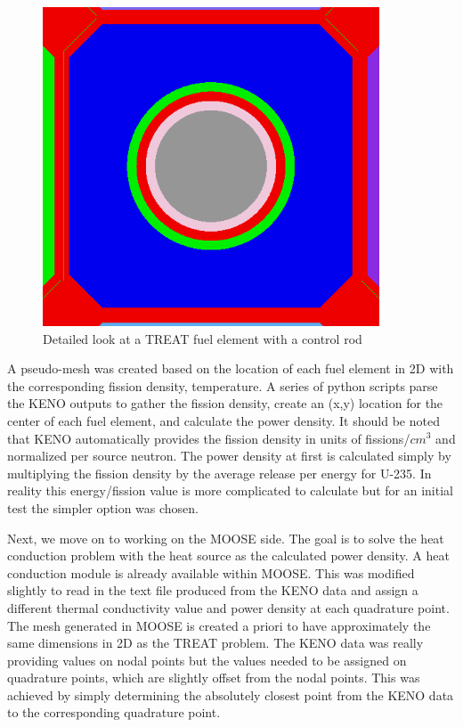 \documentclass[11pt]{article}
\begin{document}
\begin{figure}
    \centering
    \includegraphics[width=10cm]{figures/treat-fuel-elem.png}
    \caption{Detailed look at a TREAT fuel element with a control rod}
    \label{fig:treat2d}
\end{figure}

A pseudo-mesh was created based on the location of each fuel element in 2D with the corresponding fission density, temperature.  A series of python scripts parse the KENO outputs to gather the fission density, create an (x,y) location for the center of each fuel element, and calculate the power density. It should be noted that KENO automatically provides the fission density in units of fissions/$cm^3$ and normalized per source neutron. The power density at first is calculated simply by multiplying the fission density by the average release per energy for U-235.  In reality this energy/fission value is more complicated to calculate but for an initial test the simpler option was chosen.  

	Next, we move on to working on the MOOSE side.  The goal is to solve the heat conduction problem with the heat source as the calculated power density. A heat conduction module is already available within MOOSE.  This was modified slightly to read in the text file produced from the KENO data and assign a different thermal conductivity value and power density at each quadrature point.  The mesh generated in MOOSE is created a priori to have approximately the same dimensions in 2D as the TREAT problem.  The KENO data was really providing values on nodal points but the values needed to be assigned on quadrature points, which are slightly offset from the nodal points.  This was achieved by simply determining the absolutely closest point from the KENO data to the corresponding quadrature point. 
	
\end{document}

